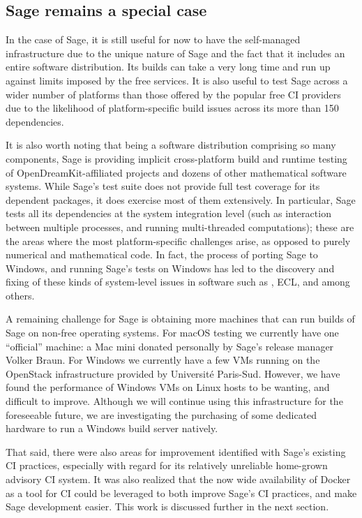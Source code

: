 \documentclass{deliverablereport}
\begin{document}

\subsection{Sage remains a special case}
In the case of Sage, it is still useful for now to have the self-managed
infrastructure due to the unique nature of Sage and the fact that it includes
an entire software distribution.  Its builds can take a very long time and run
up against limits imposed by the free services.  It is also useful to test
Sage across a wider number of platforms than those offered by the popular free
CI providers due to the likelihood of platform-specific build issues across its
more than 150 dependencies.

It is also worth noting that being a software distribution comprising so many
components, Sage is providing implicit cross-platform build and runtime testing of
OpenDreamKit-affiliated projects and dozens of other mathematical software
systems.  While Sage's test suite does not provide full test coverage for its
dependent packages, it does exercise most of them extensively.  In particular,
Sage tests all its dependencies at the system integration level (such as
interaction between multiple processes, and running multi-threaded
computations); these are the areas where the most platform-specific challenges
arise, as opposed to purely numerical and mathematical code.  In fact, the
process of porting Sage to Windows, and running Sage's tests on Windows
 has led to the discovery and fixing of these kinds of
system-level issues in software such as \GAP, ECL, and \PariGP among
others.

A remaining challenge for Sage is obtaining more machines that can run builds
of Sage on non-free operating systems.  For macOS testing we currently have
one ``official'' machine: a Mac mini donated personally by Sage's release
manager Volker Braun. For Windows we currently have a few VMs running on the
OpenStack infrastructure provided by Universit\'e Paris-Sud.  However, we have
found the performance of Windows VMs on Linux hosts to be wanting, and
difficult to improve. Although we will continue using this infrastructure for
the foreseeable future, we are investigating the purchasing of some dedicated
hardware to run a Windows build server natively.

That said, there were also areas for improvement identified with Sage's
existing CI practices, especially with regard for its relatively unreliable
home-grown advisory CI system.  It was also realized that the now wide
availability of Docker as a tool for CI could be leveraged to both improve
Sage's CI practices, and make Sage development easier.  This work is discussed
further in the next section.
\end{document}
